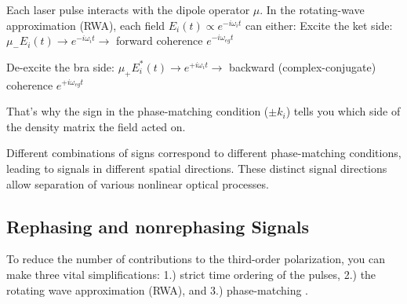 Each laser pulse interacts with the dipole operator $\mu$.
In the rotating-wave approximation (RWA), each field $E_i(t) \propto e^{-i\omega_i t}$ can either:
Excite the ket side: $\mu_{-} E_i(t) \rightarrow e^{-i\omega_i t} \rightarrow$ forward coherence $e^{-i\omega_{eg} t}$

De-excite the bra side: $\mu_{+} E_i^{*}(t) \rightarrow e^{+i\omega_i t} \rightarrow$ backward (complex-conjugate) coherence $e^{+i\omega_{eg} t}$

That's why the sign in the phase-matching condition ($\pm k_i$) tells you which side of the density matrix the field acted on.

\noindent 
Different combinations of signs correspond to different phase-matching conditions, leading to signals in different spatial directions. These distinct signal directions allow separation of various nonlinear optical processes.


\subsection{Rephasing and nonrephasing Signals}
\label{subsec:rephasing_nonrephasing}

\noindent 
To reduce the number of contributions to the third-order polarization, you can make three vital simplifications: 1.) strict time ordering of the pulses, 2.) the rotating wave approximation (RWA), and 3.) phase-matching \cite{hamm2005principlesnonlinearoptical,  %
mukamel1995principlesnonlinearoptical, cho2009twodimensionalopticalspectroscopy, jonas2003twodimensionalfemtosecondspectroscopy}.

